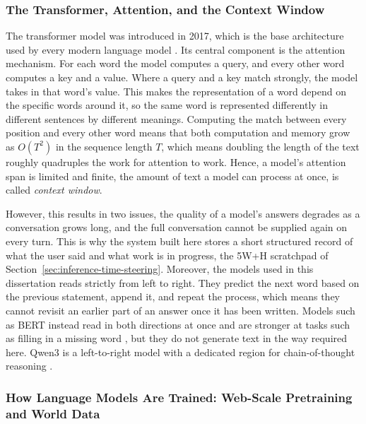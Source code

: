 \subsubsection{The Transformer, Attention, and the Context Window}
\label{subsec:transformer-attention}

The transformer model was introduced in 2017, which is the base architecture used by every modern language model \cite{vaswani2023attentionneed}. Its central component is the attention mechanism. For each word the model computes a query, and every other word computes a key and a value. Where a query and a key match strongly, the model takes in that word's value. This makes the representation of a word depend on the specific words around it, so the same word is represented differently in different sentences by different meanings. Computing the match between every position and every other word means that both computation and memory grow as $O(T^{2})$ in the sequence length $T$, which means doubling the length of the text roughly quadruples the work for attention to work. Hence, a model's attention span is limited and finite, the amount of text a model can process at once, is called \emph{context window}. 

However, this results in two issues, the quality of a model's answers degrades as a conversation grows long, and the full conversation cannot be supplied again on every turn. This is why the system built here stores a short structured record of what the user said and what work is in progress, the 5W+H scratchpad of Section~\ref{sec:inference-time-steering}. Moreover, the models used in this dissertation reads strictly from left to right. They predict the next word based on the previous statement, append it, and repeat the process, which means they cannot revisit an earlier part of an answer once it has been written. Models such as BERT instead read in both directions at once and are stronger at tasks such as filling in a missing word \cite{devlin2019bertpretrainingdeepbidirectional}, but they do not generate text in the way required here. Qwen3 is a left-to-right model with a dedicated region for chain-of-thought reasoning \cite{yang2025qwen3technicalreport}.

\subsubsection{How Language Models Are Trained: Web-Scale Pretraining and World Data}
\label{subsec:training-and-world-data}


